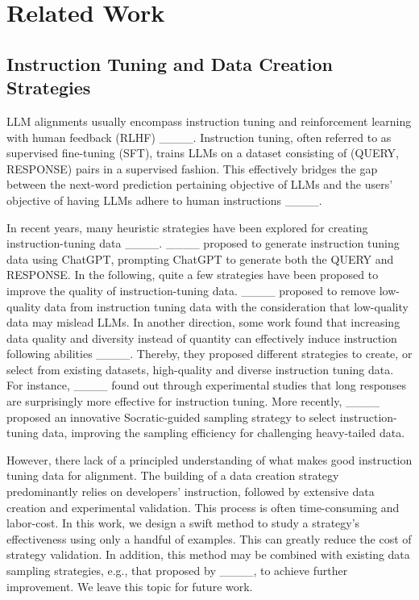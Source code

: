 \section{Related Work}
\subsection{Instruction Tuning and Data Creation Strategies}

LLM alignments usually encompass instruction tuning and reinforcement learning with human feedback (RLHF) ____. Instruction tuning, often referred to as supervised fine-tuning (SFT),  trains LLMs on a dataset consisting of (QUERY, RESPONSE) pairs in a supervised fashion. This effectively bridges the gap between the next-word prediction pertaining objective of LLMs and
the users’ objective of having LLMs adhere to human instructions ____.

In recent years, many heuristic strategies have been explored for creating instruction-tuning data ____. ____ proposed to generate instruction tuning data using ChatGPT, prompting ChatGPT to generate both the QUERY and RESPONSE. In the following, quite a few strategies have been proposed to improve the quality of instruction-tuning data. ____ proposed to remove low-quality data from instruction tuning data with the consideration that low-quality data may mislead LLMs. In another direction, some work found that increasing data quality and diversity instead of quantity can effectively induce instruction following abilities ____. Thereby, they proposed different strategies to create, or select from existing datasets, high-quality and diverse instruction tuning data. 
For instance, ____ found out through experimental studies that long responses are surprisingly more effective for instruction tuning. 
More recently, ____ proposed an innovative Socratic-guided sampling strategy to select instruction-tuning data, improving the sampling efficiency for challenging heavy-tailed data.

However, there lack of a principled understanding of what makes good instruction tuning data for alignment. The building of a data creation strategy predominantly relies on developers' instruction, followed by extensive data creation and experimental validation.
This process is often time-consuming and labor-cost. In this work, we design a swift method to study a strategy's effectiveness using only a handful of examples. This can greatly reduce the cost of strategy validation. In addition, this method may be combined with existing data sampling strategies, e.g., that proposed by ____, to achieve further improvement. We leave this topic for future work.

